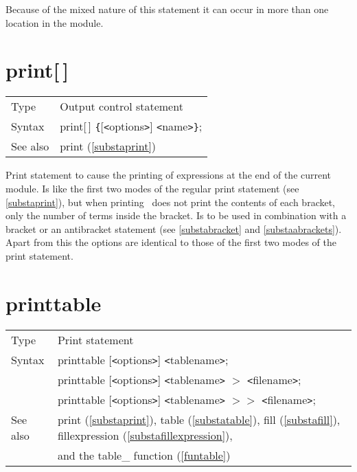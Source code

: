 \noindent Because of the mixed nature of this statement it can occur in 
more than one location in the module. \vspace{10mm}


\section{\texorpdfstring{print[\,]}{print[ ]}}
\label{substaprintc}

\noindent \begin{tabular}{ll}
Type & Output control statement\\
Syntax & print[\,] \verb:{:[{\tt<}options{\tt>}] {\tt<}name{\tt>}\verb:}:;
\\ See also & print (\ref{substaprint})
\end{tabular}\vspace{4mm}

\noindent Print statement to cause the printing 
of expressions at the end of the current module. Is like the first two 
modes of the regular print statement (see \ref{substaprint}), but when 
printing \FORM\ does not print the contents of each bracket, 
only the number of terms inside the bracket. Is to be used in combination 
with a bracket or an antibracket statement (see 
\ref{substabracket} and \ref{substaabrackets}). Apart from this the options 
are identical to those of the first two modes of the print statement. 
\vspace{10mm}


\section{printtable}
\label{substaprinttable}

\noindent \begin{tabular}{ll}
Type & Print statement\\
Syntax & printtable [{\tt<}options{\tt>}] {\tt<}tablename{\tt>};  \\
       & printtable [{\tt<}options{\tt>}] {\tt<}tablename{\tt>} $>$ {\tt<}filename{\tt>}; \\
       & printtable [{\tt<}options{\tt>}] {\tt<}tablename{\tt>} $>\!\!>$ {\tt<}filename{\tt>};
\\ See also & print (\ref{substaprint}),
            table (\ref{substatable}),
            fill (\ref{substafill}),
            fillexpression (\ref{substafillexpression}), \\ &
            and the table\_ function (\ref{funtable})
\end{tabular}\vspace{4mm}

